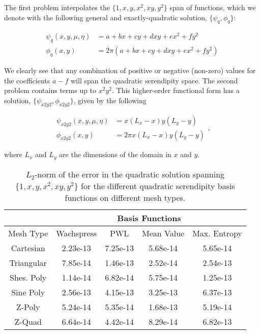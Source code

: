\documentclass[preprint,10pt]{elsarticle}
\begin{document}
The first problem interpolates the $\{ 1, x, y, x^2, xy, y^2 \}$ span of functions, which we denote with the following general and exactly-quadratic solution, $\{\psi_q, \phi_q\}$:

\begin{equation}
\label{eq::Results_Quadratic_fluxsols}
\begin{aligned}
\psi_q (x,y,\mu,\eta) &= a + bx + c y+ d xy + e x^2 + fy^2 \\
\phi_q (x,y) &= 2 \pi \left(  a + bx + c y+ d xy + e x^2 + fy^2 \right)
\end{aligned} 
\end{equation}

\noindent We clearly see that any combination of positive or negative (non-zero) values for the coefficients $a-f$ will span the quadratic serendipity space. The second problem contains terms up to $x^2 y^2$. This higher-order functional form has a solution, $\{ \psi_{x2y2}, \phi_{x2y2}\}$, given by the following

\begin{equation}
\label{eq::Results_x2y2_fluxsols}
\begin{aligned}
\psi_{x2y2} (x,y,\mu,\eta) &= x \left(L_x - x \right) y \left(L_y - y \right) \\
\phi_{x2y2} (x,y) &= 2 \pi x \left(L_x - x \right) y \left(L_y - y \right) 
\end{aligned} ,
\end{equation}

\noindent where $L_x$ and $L_y$ are the dimensions of the domain in $x$ and $y$.

\begin{table}[hbt]
\caption{$L_2$-norm of the error in the quadratic solution spanning $\{ 1, x, y, x^2, xy, y^2 \}$ for the different quadratic serendipity basis functions on different mesh types.}
\centering
\def\arraystretch{1.25}
\begin{tabular}{|c|c|c|c|c|}
\hline
& \multicolumn{4}{c}{Basis Functions}\vline\\
\hline
Mesh Type & Wachspress & PWL& Mean Value& Max. Entropy \\
\hline
Cartesian&2.23e-13&7.25e-13&5.68e-14&5.65e-14\\
Triangular&7.85e-14&1.46e-13&2.52e-14&2.54e-13\\
Shes. Poly&1.14e-14&6.82e-14&5.75e-14&1.25e-13\\
Sine Poly&2.56e-13&4.15e-13&3.25e-13&6.37e-13\\
Z-Poly&5.24e-14&5.35e-14&1.68e-13&5.19e-14\\
Z-Quad&6.64e-14&4.42e-14&8.29e-14&6.82e-13\\
\hline
\end{tabular}
\end{table}
\end{document}
